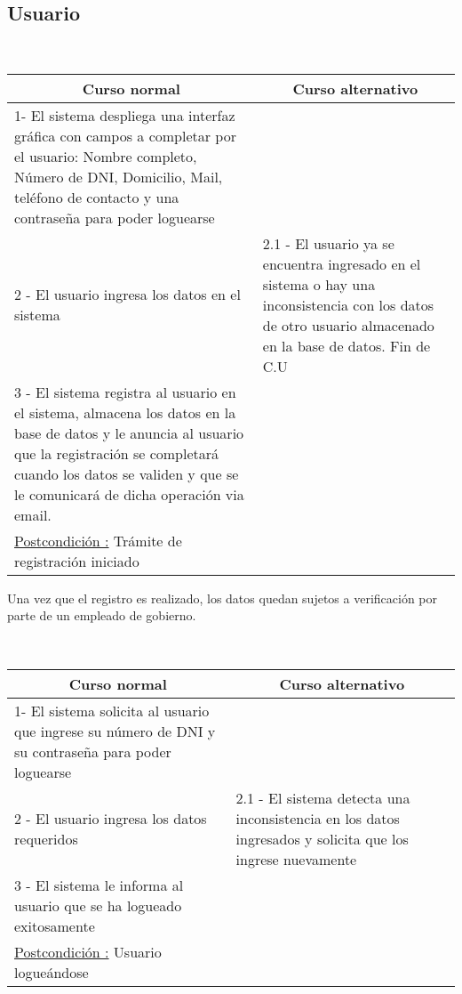 \subsection{Usuario}

~


\begin{center}
    \centering
    \begin{tabular}{ | p{11cm} | p{6cm} | }
    	\multicolumn{1}{c}{\cellcolor{black!30}\textbf{Curso normal}} & 
    	\multicolumn{1}{c}{\cellcolor{black!30}\textbf{Curso alternativo}} \\
		\hline
		1- El sistema despliega una interfaz gráfica con campos a completar
		por el usuario: Nombre completo, Número de DNI, Domicilio, Mail, teléfono
		de contacto y una contrase\~na para poder loguearse & \\ \hline
		2 - El usuario ingresa los datos en el sistema & 2.1 - El usuario ya se encuentra ingresado en el sistema
		o hay una inconsistencia con los datos de otro usuario almacenado en la base de datos. Fin de C.U \\ \hline
		3 - El sistema registra al usuario en el sistema, almacena los datos en la base de datos y le anuncia al usuario que la registración se completará cuando los datos se validen y que se le comunicará de dicha operación via email.& \\ \hline
		\underline{Postcondición :} Trámite de registración iniciado & \\ \hline
    \end{tabular}
\end{center}

Una vez que el registro es realizado, los datos quedan sujetos a verificación por parte de un empleado de gobierno.

~

\begin{center}
    \centering
    \begin{tabular}{ | p{11cm} | p{6cm} | }
    	\multicolumn{1}{c}{\cellcolor{black!30}\textbf{Curso normal}} & 
    	\multicolumn{1}{c}{\cellcolor{black!30}\textbf{Curso alternativo}} \\
		\hline
		1- El sistema solicita al usuario que ingrese su número de DNI y su contrase\~na para poder loguearse
		&  \\ \hline
		2 - El usuario ingresa los datos requeridos & 2.1 - El sistema detecta una inconsistencia en los datos ingresados y
		solicita que los ingrese nuevamente \\ \hline
		3 - El sistema le informa al usuario que se ha logueado exitosamente & \\ \hline
		\underline{Postcondición :} Usuario logueándose & \\ \hline
    \end{tabular}
\end{center}

